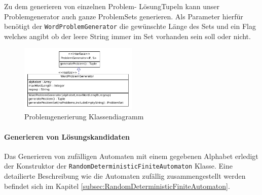 Zu dem generieren von einzelnen \flqq Problem\frqq - \flqq Lösung\frqq Tupeln kann unser Problemgenerator auch ganze ProblemSets generieren. Als Parameter hierfür benötigt der \lstinline$WordProblemGenerator$ die gewünschte Länge des Sets und ein Flag welches angibt ob der leere String immer im Set vorhanden sein soll oder nicht.

\begin{figure}[h]
  \centering
  \includegraphics[width=0.5\textwidth]{images/simple_uml_pg.pdf}
  \caption[Problemgenerierung Klassendiagramm]{Problemgenerierung Klassendiagramm}
  \label{fig:ea_pg_classdiag_simple}
\end{figure}


\paragraph{Generieren von Lösungskandidaten}
Das Generieren von zufälligen Automaten mit einem gegebenen Alphabet erledigt der Konstruktor der \lstinline$RandomDeterministicFiniteAutomaton$ Klasse. Eine detailierte Beschreibung wie die Automaten zufällig zusammengestellt werden befindet sich im Kapitel \ref{subsec:RandomDeterministicFiniteAutomaton}.
